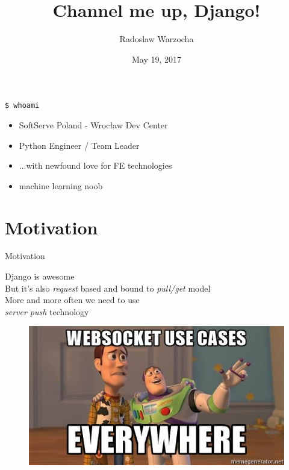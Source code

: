 \documentclass{beamer}
\title{Channel me up, Django!}
\author[Radoslaw Warzocha]{Radoslaw Warzocha}
\date{May 19, 2017}
\begin{document}
\begin{frame}
	\titlepage
\end{frame}

\begin{frame}{\texttt{\$ whoami}}
	\begin{itemize}
		\item SoftServe Poland - Wrocław Dev Center
		\item Python Engineer / Team Leader
		\item ...with newfound love for FE technologies
		\item machine learning noob
	\end{itemize}
\end{frame}

\section{Motivation}

\begin{frame}{Motivation}
	\begin{center}
		Django is awesome\\
		\vspace{1em}
		But it's also \textit{request} based and bound to \textit{pull/get} model\\
		\vspace{1em}
		More and more often we need to use\\
		\textit{server push} technology
		
		\begin{figure}
			\includegraphics[scale=0.45]{websockets_everywhere.jpg}
		\end{figure}
	\end{center}
\end{frame}
\end{document}
